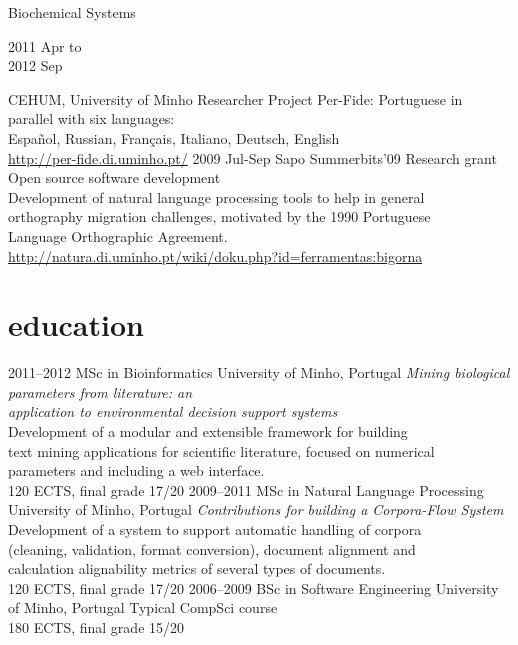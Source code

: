 \documentclass[a4paper]{friggeri-cv}
\begin{document}
\begin{entrylist}
{    Biochemical Systems}
  \entry
    {\parbox[t][][t]{1.8cm}{2011 {\footnotesize Apr to}\\2012 {\footnotesize Sep}}}
    {CEHUM, University of Minho}
    {Researcher}
    {Project Per-Fide: Portuguese in parallel with six languages:\\
    Español, Russian, Français, Italiano, Deutsch, English\\
    {\footnotesize
    \url{http://per-fide.di.uminho.pt/}
    }}
  \entry
    {2009 {\footnotesize Jul-Sep}}
    {Sapo Summerbits'09}
    {Research grant}
    {Open source software development\\
    \footnotesize{
    Development of natural language processing tools to help in general\\
    orthography migration challenges, motivated by the 1990 Portuguese\\
    Language Orthographic Agreement.\\
    \url{http://natura.di.uminho.pt/wiki/doku.php?id=ferramentas:bigorna}}}
\end{entrylist}



\newpage
\section{education}

\begin{entrylist}
  \entry
    {2011--2012}
    {MSc in Bioinformatics}
    {University of Minho, Portugal}
    {\emph{Mining biological parameters from literature: an\\
    application to environmental decision support systems}\\
    {\footnotesize{Development of a modular and extensible framework
    for building\\
    text mining applications for scientific literature, focused on
    numerical\\ 
    parameters and including a web interface.}}\\
    120 ECTS, final grade 17/20
    }
  \entry
    {2009--2011}
    {MSc in Natural Language Processing}
    {University of Minho, Portugal}
    {\emph{Contributions for building a Corpora-Flow System}\\
    {\footnotesize{Development of a system to support automatic handling of corpora\\
    (cleaning, validation, format conversion), document alignment and\\
    calculation alignability metrics of several types of documents.}}\\
    120 ECTS, final grade 17/20
    }
  \entry
    {2006--2009}
    {BSc in Software Engineering}
    {University of Minho, Portugal}
    {{\footnotesize Typical CompSci course}\\
    180 ECTS, final grade 15/20}
\end{entrylist}
\end{document}
